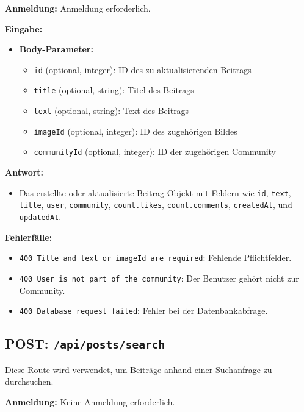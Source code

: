 \documentclass[a4paper,12pt]{article}
\begin{document}
\textbf{Anmeldung:} Anmeldung erforderlich.

\textbf{Eingabe:}
\begin{itemize}
    \item \textbf{Body-Parameter:}
    \begin{itemize}
        \item \texttt{id} (optional, integer):
            ID des zu aktualisierenden Beitrags
        \item \texttt{title} (optional, string):
            Titel des Beitrags
        \item \texttt{text} (optional, string):
            Text des Beitrags
        \item \texttt{imageId} (optional, integer):
            ID des zugehörigen Bildes
        \item \texttt{communityId} (optional, integer):
            ID der zugehörigen Community
    \end{itemize}
\end{itemize}

\textbf{Antwort:}
\begin{itemize}
    \item Das erstellte oder aktualisierte Beitrag-Objekt mit Feldern wie
        \texttt{id},
        \texttt{text},
        \texttt{title},
        \texttt{user},
        \texttt{community},
        \texttt{count.likes},
        \texttt{count.comments},
        \texttt{createdAt},
        und \texttt{updatedAt}.
\end{itemize}

\textbf{Fehlerfälle:}
\begin{itemize}
    \item \texttt{400 Title and text or imageId are required}:
        Fehlende Pflichtfelder.
    \item \texttt{400 User is not part of the community}:
        Der Benutzer gehört nicht zur Community.
    \item \texttt{400 Database request failed}:
        Fehler bei der Datenbankabfrage.
\end{itemize}

\newpage
\subsection{POST: \texttt{/api/posts/search}}

Diese Route wird verwendet, um Beiträge anhand einer Suchanfrage zu
durchsuchen.

\textbf{Anmeldung:} Keine Anmeldung erforderlich.
\end{document}
